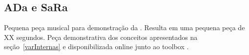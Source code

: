 \subsection{ADa e SaRa}\label{ap:ada}
Pequena peça musical para demonstração da . Resulta em uma pequena peça de XX segundos. Peça demonstrativa dos conceitos apresentados na seção~\ref{varInternas} e disponibilizada online junto ao toolbox \massa.



